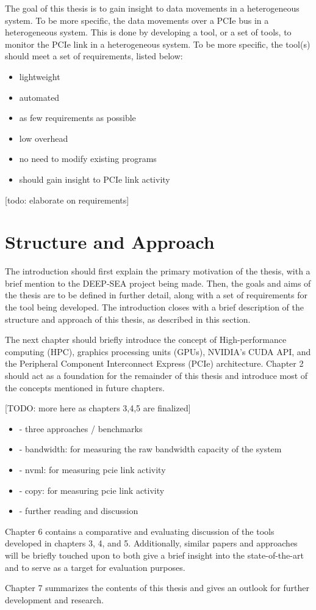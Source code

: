 The goal of this thesis is to gain insight to data movements in a heterogeneous system. To be more specific, the data movements over a PCIe bus in a heterogeneous system. This is done by developing a tool, or a set of tools, to monitor the PCIe link in a heterogeneous system. To be more specific, the tool(s) should meet a set of requirements, listed below: 
\begin{itemize}
\item lightweight
\item automated
\item as few requirements as possible
\item low overhead
\item no need to modify existing programs
\item should gain insight to PCIe link activity
\end{itemize}

[todo: elaborate on requirements]

\section{Structure and Approach}

The introduction should first explain the primary motivation of the thesis, with a brief mention to the DEEP-SEA project being made. Then, the goals and aims of the thesis are to be defined in further detail, along with a set of requirements for the tool being developed. The introduction closes with a brief description of the structure and approach of this thesis, as described in this section.

The next chapter should briefly introduce the concept of High-performance computing (HPC), graphics processing units (GPUs), NVIDIA's CUDA API, and the Peripheral Component Interconnect Express (PCIe) architecture. Chapter 2 should act as a foundation for the remainder of this thesis and introduce most of the concepts mentioned in future chapters.

[TODO: more here as chapters 3,4,5 are finalized]
\begin{itemize}
	\item - three approaches / benchmarks
	\item - bandwidth: for measuring the raw bandwidth capacity of the system
	\item - nvml: for measuring pcie link activity
	\item - copy: for measuring pcie link activity
	\item - further reading and discussion 
\end{itemize}

Chapter 6 contains a comparative and evaluating discussion of the tools developed in chapters 3, 4, and 5. Additionally, similar papers and approaches will be briefly touched upon to both give a brief insight into the state-of-the-art and to serve as a target for evaluation purposes.

Chapter 7 summarizes the contents of this thesis and gives an outlook for further development and research.


